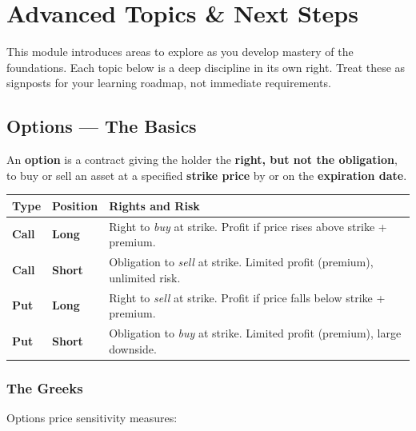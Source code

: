
\chapter{Advanced Topics \& Next Steps}

\begin{notebox}
This module introduces areas to explore as you develop mastery of the foundations.
Each topic below is a deep discipline in its own right. Treat these as
signposts for your learning roadmap, not immediate requirements.
\end{notebox}

\section{Options — The Basics}

An \textbf{option} is a contract giving the holder the \textbf{right, but not the obligation},
to buy or sell an asset at a specified \textbf{strike price} by or on the \textbf{expiration date}.

\begin{center}
\begin{tabular}{>{\bfseries}p{2.5cm} >{\bfseries}p{2.5cm} p{7.5cm}}
\toprule
Type & Position & Rights and Risk \\
\midrule
Call & Long & Right to \emph{buy} at strike. Profit if price rises above strike + premium. \\
Call & Short & Obligation to \emph{sell} at strike. Limited profit (premium), unlimited risk. \\
Put & Long & Right to \emph{sell} at strike. Profit if price falls below strike + premium. \\
Put & Short & Obligation to \emph{buy} at strike. Limited profit (premium), large downside. \\
\bottomrule
\end{tabular}
\end{center}

\subsection{The Greeks}
Options price sensitivity measures:

